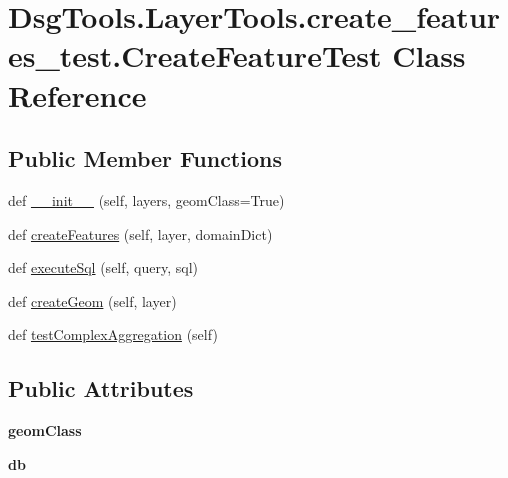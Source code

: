 \hypertarget{class_dsg_tools_1_1_layer_tools_1_1create__features__test_1_1_create_feature_test}{}\section{Dsg\+Tools.\+Layer\+Tools.\+create\+\_\+features\+\_\+test.\+Create\+Feature\+Test Class Reference}
\label{class_dsg_tools_1_1_layer_tools_1_1create__features__test_1_1_create_feature_test}
\subsection*{Public Member Functions}
\begin{DoxyCompactItemize}
\item 
def \mbox{\hyperlink{class_dsg_tools_1_1_layer_tools_1_1create__features__test_1_1_create_feature_test_a113d1b62b5bd0b6682c491dd58166374}{\+\_\+\+\_\+init\+\_\+\+\_\+}} (self, layers, geom\+Class=True)
\item 
def \mbox{\hyperlink{class_dsg_tools_1_1_layer_tools_1_1create__features__test_1_1_create_feature_test_a4b7c74aa14ef03f705e97827e9943c64}{create\+Features}} (self, layer, domain\+Dict)
\item 
def \mbox{\hyperlink{class_dsg_tools_1_1_layer_tools_1_1create__features__test_1_1_create_feature_test_a144d062e59edc0d33040b0acb30c2e5b}{execute\+Sql}} (self, query, sql)
\item 
def \mbox{\hyperlink{class_dsg_tools_1_1_layer_tools_1_1create__features__test_1_1_create_feature_test_a4f0ff4286954932c222672f6f34ff96b}{create\+Geom}} (self, layer)
\item 
def \mbox{\hyperlink{class_dsg_tools_1_1_layer_tools_1_1create__features__test_1_1_create_feature_test_a9b4d7b19468f8bbe7e7ec64ad4e465cd}{test\+Complex\+Aggregation}} (self)
\end{DoxyCompactItemize}
\subsection*{Public Attributes}
\begin{DoxyCompactItemize}
\item 
\mbox{\label{class_dsg_tools_1_1_layer_tools_1_1create__features__test_1_1_create_feature_test_acbec29ecba926aeecea647dd2c741ae9}} 
{\bfseries geom\+Class}
\item 
\mbox{\label{class_dsg_tools_1_1_layer_tools_1_1create__features__test_1_1_create_feature_test_a15fd37f76a89cd036243798f6497f54f}} 
{\bfseries db}
\end{DoxyCompactItemize}


